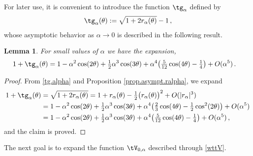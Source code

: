\documentclass[a4paper,reqno,10pt]{article}
\newtheorem{lem}{Lemma}[section]
\begin{document}
For later use, it is convenient to introduce the function $\tg_{\alpha}$ defined by
\begin{equation}\label{tg.alpha}
	\tg_{\alpha}(\theta) := \sqrt{1+2r_\alpha(\theta)} -1 \,,
\end{equation}
whose asymptotic behavior as $\alpha \to 0$ is described in the following result.
	\begin{lem}\label{sqrt.1+ralpha}
	For small values of $\alpha$ we have the expansion,
		\begin{align*}
			1 + \tg_{\alpha}(\theta) 
			& = 1 - \alpha^2 \cos(2\theta) + \tfrac12 \alpha^3 \cos(3\theta) + \alpha^4 \big( \tfrac{5}{12}\cos(4\theta) -  \tfrac14  \big) + O(\alpha^5) \,.
		\end{align*}
\end{lem}
\begin{proof}
	From \eqref{tg.alpha} and Proposition \ref{prop.asympt.ralpha}, we expand
		\begin{align}
			1+ \tg_{\alpha}(\theta) & = \sqrt{1+2r_\alpha(\theta)} = 1+ r_\alpha(\theta) - \tfrac12 \big( r_\alpha(\theta) \big)^2 + O(|r_\alpha|^3) \\
			& = 1 - \alpha^2 \cos(2\theta) + \tfrac12 \alpha^3 \cos(3\theta) + \alpha^4 \big( \tfrac23 \cos(4\theta)  - \tfrac12 \cos^2(2\theta) \big) + O(\alpha^5)  \\
			& = 1 - \alpha^2 \cos(2\theta) + \tfrac12 \alpha^3 \cos(3\theta) +\alpha^4 \big(  \tfrac{5}{12}\cos(4\theta) - \tfrac14   \big) + O(\alpha^5) \,,
		\end{align}
	and the claim is proved.
\end{proof}
The next goal is to expand the function $\tV_{0,\alpha}$ described through  \eqref{wttV}.
\end{document}
